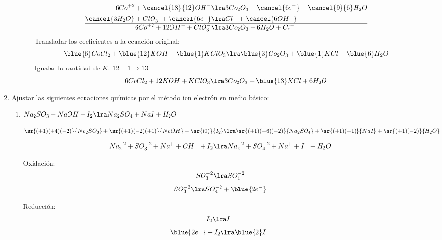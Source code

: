 \documentclass[../Práctica.root.tex]{subfiles}
\begin{document}
\begin{enumerate}
\begin{enumerate}
\begin{itemize}
                              \begin{align*}
                                  6 Co^{+2} + \cancel{18}{12} OH^-           & \lra  3 Co_2O_3 + \cancel{6 e^-} + \cancel{9}{6} H_2O \\
                                  \cancel{3 H_2O} + ClO_3^- + \cancel{6 e^-} & \lra Cl^- + \cancel{6 OH^-}                           \\
                                  \hline
                                  6 Co^{+2} + 12 OH^- + ClO_3^-              & \lra 3 Co_2O_3 + 6 H_2O + Cl^-
                              \end{align*}
                              Transladar los coeficientes a la ecuación original: \\
                              \[ \blue{6} CoCl_2 + \blue{12} KOH + \blue{1} KClO_3 \lra \blue{3} Co_2O_3 + \blue{1} KCl + \blue{6} H_2O \]
                              Igualar la cantidad de $K$. $12 + 1 \rightarrow 13$ \\
                              \[ 6 CoCl_2 + 12 KOH + KClO_3 \lra 3 Co_2O_3 + \blue{13} KCl + 6 H_2O \]
                    \end{itemize}
          \end{enumerate}

    \item Ajustar las siguientes ecuaciones químicas por el método ion electrón en medio básico:
          \begin{enumerate}
              \item $Na_2SO_3 + NaOH + I_2 \lra Na_2SO_4 + NaI + H_2O$

                    $\sr{(+1)(+4)(-2)}{Na_2SO_3} + \sr{(+1)(-2)(+1)}{NaOH} + \sr{(0)}{I_2}
                        \lra \sr{(+1)(+6)(-2)}{Na_2SO_4} + \sr{(+1)(-1)}{NaI} + \sr{(+1)(-2)}{H_2O}$

                    \[ Na_2^{+2} + SO_3^{-2} + Na^+ + OH^- + I_2 \lra Na_2^{+2} + SO_4^{-2} + Na^+ + I^- + H_2O \]

                    \begin{multicols}{2}
                        Oxidación:
                        \[ SO_3^{-2} \lra SO_4^{-2} \]
                        \[ SO_3^{-2} \lra SO_4^{-2} + \blue{2e^-} \]

                        \columnbreak

                        Reducción:
                        \[ I_2 \lra I^- \]
                        \[ \blue{2e^-} + I_2 \lra \blue{2} I^- \]
                    \end{multicols}


\end{enumerate}
\end{enumerate}
\end{document}
